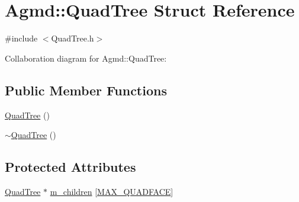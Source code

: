 \hypertarget{struct_agmd_1_1_quad_tree}{\section{Agmd\+:\+:Quad\+Tree Struct Reference}
\label{struct_agmd_1_1_quad_tree}
}


{\ttfamily \#include $<$Quad\+Tree.\+h$>$}



Collaboration diagram for Agmd\+:\+:Quad\+Tree\+:
\subsection*{Public Member Functions}
\begin{DoxyCompactItemize}
\item 
\hyperlink{struct_agmd_1_1_quad_tree_a6c50cdb288a5df70ddfa8e241c33259e}{Quad\+Tree} ()
\item 
\hyperlink{struct_agmd_1_1_quad_tree_a20bc614730a3baea708dd10e2226bccb}{$\sim$\+Quad\+Tree} ()
\end{DoxyCompactItemize}
\subsection*{Protected Attributes}
\begin{DoxyCompactItemize}
\item 
\hyperlink{struct_agmd_1_1_quad_tree}{Quad\+Tree} $\ast$ \hyperlink{struct_agmd_1_1_quad_tree_a8915de21c8dac00382b960af402a871c}{m\+\_\+children} \mbox{[}\hyperlink{_quad_tree_8h_a6da02e504496031b6849288af10ff677}{M\+A\+X\+\_\+\+Q\+U\+A\+D\+F\+A\+C\+E}\mbox{]}
\end{DoxyCompactItemize}


